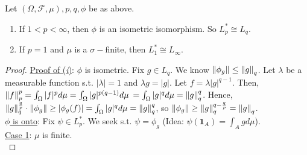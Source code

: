 \documentclass{article}
\begin{document}
\begin{theorem}\label{thm: Dual of L_p}
Let $(\Omega, \mathcal{F}, \mu), p, q, \phi$ be as above.
    \begin{enumerate}[label = (\roman*), align = left]
        \item If $1<p<\infty$, then $\phi$ is an isometric isomorphism. So $L_p^*\cong L_q$.
        \item If $p=1$ and $\mu$ is a $\sigma-$finite, then $L_1^*\cong L_\infty$.
    \end{enumerate}
\end{theorem}

\begin{proof}
    \noindent\underline{Proof of (\textit{i})}: $\phi$ is isometric. Fix $g\in L_q$. We know $\left\lVert\phi_g\right\rVert\leq  \left\lVert g\right\rVert_q$.  Let $\lambda$ be a measurable function s.t. $|\lambda|=1$ and $\lambda g=|g|$.  Let $f = \lambda|g|^{q-1}$. Then, $\left\lVert f\right\rVert_p^p=\int_\Omega |f|^p d\mu=\int_\Omega |g|^{p(q-1)} d\mu$ $=\int_\Omega |g|^{q} d\mu=\left\lVert g\right\rVert_q^q$. Hence, $\left\lVert g\right\rVert_q^{\frac{q}{p}}\cdot \left\lVert\phi_g\right\rVert\geq |\phi_g(f)|=\int_\Omega |g|^{q} d\mu=\left\lVert g\right\rVert_q^q$, so $\left\lVert\phi_g\right\rVert\geq \left\lVert g\right\rVert_q^{q-\frac{q}{p}}=\left\lVert g\right\rVert_q$.\\

    \noindent\underline{$\phi$ is onto}:  Fix $\psi\in L_p^*$. We seek  s.t. $\psi = \phi_g$ (Idea: $\psi(\mathbf{1}_A)=\int_A g d\mu$).\\

    \noindent\underline{Case 1}: $\mu$ is finite.\\
    

\end{proof}
\end{document}
